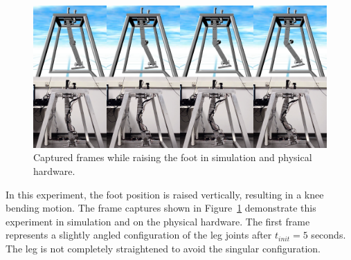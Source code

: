 \begin{figure}[!b]
	\centering
    \includegraphics[scale=0.22]{fig/experiments/kneebendframes.png} 
  	\caption{Captured frames while raising the foot in simulation and physical hardware.}
	\label{fig:kneebendframes}
\end{figure}

In this experiment, the foot position is raised vertically, resulting in a knee bending motion. The frame captures shown in Figure~\ref{fig:kneebendframes} demonstrate this experiment in simulation and on the physical hardware. The first frame represents a slightly angled configuration of the leg joints after $t_{init} = 5$ seconds. The leg is not completely straightened to avoid the singular configuration. 

